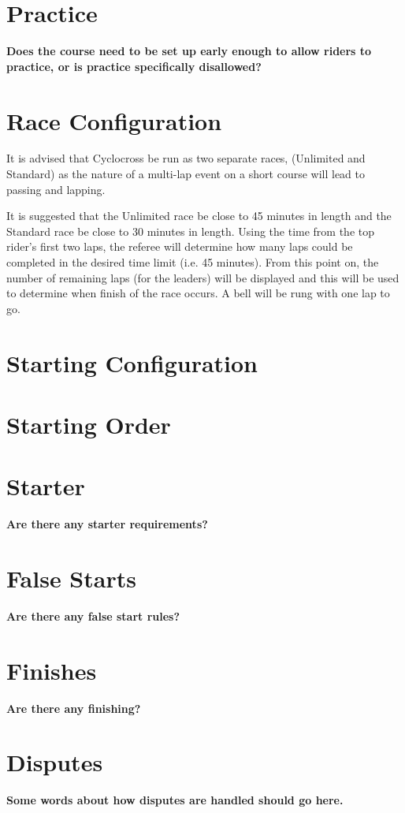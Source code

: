 \section{Practice}

\textbf{Does the course need to be set up early enough to allow riders to practice, or is practice specifically disallowed?}

\section{Race Configuration}

It is advised that Cyclocross be run as two separate races, (Unlimited and Standard) as the nature of a multi-lap event on a short course will lead to passing and lapping.

It is suggested that the Unlimited race be close to 45 minutes in length and the Standard race be close to 30 minutes in length.
Using the time from the top rider's first two laps, the referee will determine how many laps could be completed in the desired time limit (i.e. 45 minutes).
From this point on, the number of remaining laps (for the leaders) will be displayed and this will be used to determine when finish of the race occurs. A bell will be rung with one lap to go.

\section{Starting Configuration}

\section{Starting Order}

\section{Starter}

\textbf{Are there any starter requirements?}

\section{False Starts}

\textbf{Are there any false start rules?}

\section{Finishes}

\textbf{Are there any finishing?}

\section{Disputes}

\textbf{Some words about how disputes are handled should go here.}
